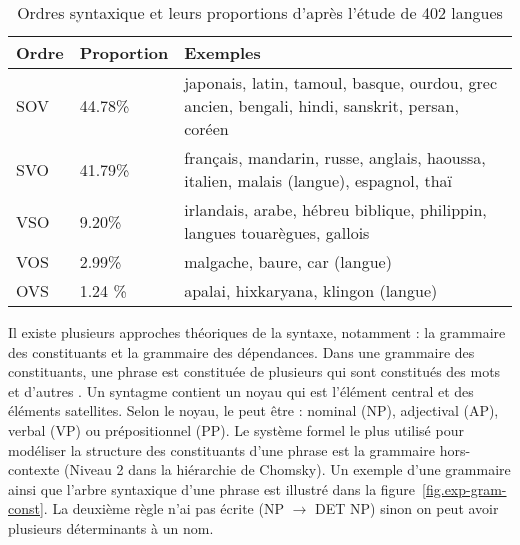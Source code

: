 \documentclass{KodeBook}
\begin{document}
\begin{table}[ht]
	\centering
	\begin{tabular}{p{}p{}p{}}
		\hline\hline 
		\textbf{Ordre} & \textbf{Proportion} & \textbf{Exemples} \\
		\hline
		SOV & 44.78\% & japonais, latin, tamoul, basque, ourdou, grec ancien, bengali, hindi, sanskrit, persan, coréen \\
		SVO & 41.79\% & français, mandarin, russe, anglais, haoussa, italien, malais (langue), espagnol, thaï \\
		VSO & 9.20\% & irlandais, arabe, hébreu biblique, philippin, langues touarègues, gallois \\
		VOS & 2.99\% & malgache, baure, car (langue) \\
		OVS & 1.24 \% & apalai, hixkaryana, klingon (langue) \\
		\hline\hline
	\end{tabular}
	\caption[Ordres syntaxiques et leurs proportions d'après l'étude de 402 langues]{Ordres syntaxique et leurs proportions d'après l'étude de 402 langues \cite{1988-blake}}
	\label{tab:ordre}
\end{table}

Il existe plusieurs approches théoriques de la syntaxe, notamment : la grammaire des constituants et la grammaire des dépendances. 
Dans une grammaire des constituants, une phrase est constituée de plusieurs  qui sont constitués des mots et d'autres .
Un syntagme contient un noyau qui est l'élément central et des éléments satellites.
Selon le noyau, le  peut être : nominal (NP), adjectival (AP), verbal (VP) ou prépositionnel (PP).
Le système formel le plus utilisé pour modéliser la structure des constituants d'une phrase est la grammaire hors-contexte (Niveau 2 dans la hiérarchie de Chomsky).
Un exemple d'une grammaire ainsi que l'arbre syntaxique d'une phrase est illustré dans la figure~\ref{fig.exp-gram-const}.
La deuxième règle n'ai pas écrite (NP $ \rightarrow $ DET NP) sinon on peut avoir plusieurs déterminants à un nom.
\end{document}
